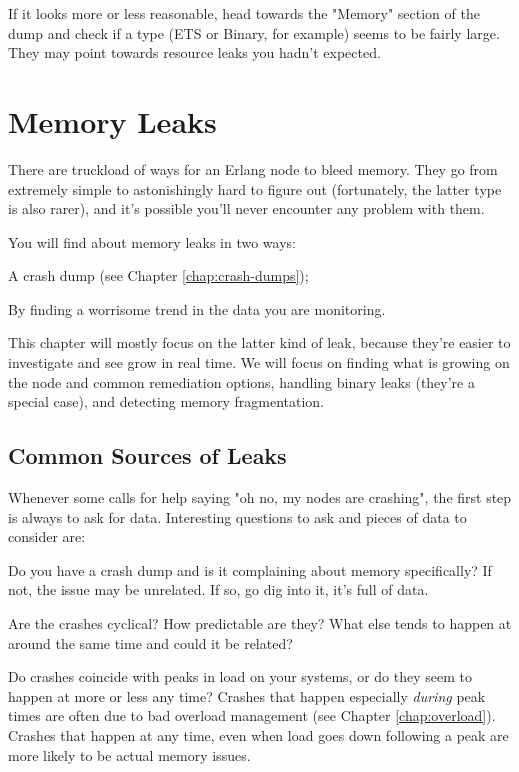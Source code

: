 \documentclass[11pt, oneside]{book}   	%
\begin{document}
If it looks more or less reasonable, head towards the "Memory" section of the dump and check if a type (ETS or Binary, for example) seems to be fairly large. They may point towards resource leaks you hadn't expected.


\chapter{Memory Leaks}
\label{chap:memory-leaks}

There are truckload of ways for an Erlang node to bleed memory. They go from extremely simple to astonishingly hard to figure out (fortunately, the latter type is also rarer), and it's possible you'll never encounter any problem with them.

You will find about memory leaks in two ways:

\begin{enumerate*}
	\item A crash dump (see Chapter \ref{chap:crash-dumps});
	\item By finding a worrisome trend in the data you are monitoring. 
\end{enumerate*}

This chapter will mostly focus on the latter kind of leak, because they're easier to investigate and see grow in real time. We will focus on finding what is growing on the node and common remediation options, handling binary leaks (they're a special case),  and detecting memory fragmentation. 
\section{Common Sources of Leaks}

Whenever some calls for help saying "oh no, my nodes are crashing", the first step is always to ask for data. Interesting questions to ask and pieces of data to consider are:

\begin{itemize*}
	\item Do you have a crash dump and is it complaining about memory specifically? If not, the issue may be unrelated. If so, go dig into it, it's full of data.
	\item Are the crashes cyclical? How predictable are they? What else tends to happen at around the same time and could it be related?
	\item Do crashes coincide with peaks in load on your systems, or do they seem to happen at more or less any time? Crashes that happen especially \emph{during} peak times are often due to bad overload management (see Chapter \ref{chap:overload}). Crashes that happen at any time, even when load goes down following a peak are more likely to be actual memory issues.
\end{itemize*}
\end{document}
